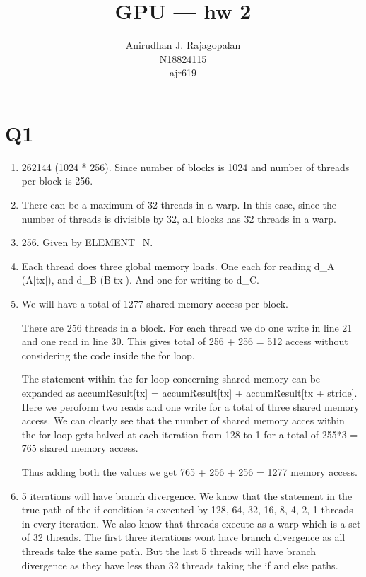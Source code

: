\documentclass{article}
\begin{document}
\title{GPU --- hw 2}
\author{Anirudhan J. Rajagopalan \\ N18824115 \\ ajr619 }
\maketitle

\newpage

\section*{Q1}
\begin{enumerate}
  \item 262144 (1024 * 256).  Since number of blocks is 1024 and number of threads per block is 256.
  \item There can be a maximum of 32 threads in a warp. In this case, since the number of threads is divisible by 32, all blocks has 32 threads in a warp.
  \item 256.  Given by ELEMENT\_N.
  \item Each thread does three global memory loads.  One each for reading d\_A (A[tx]), and d\_B (B[tx]).  And one for writing to d\_C.
  \item We will have a total of 1277 shared memory access per block.  
    
    There are 256 threads in a block.  For each thread we do one write in line 21 and one read in line 30.  This gives total of 256 + 256 = 512 access without considering the code inside the for loop.

    The statement within the for loop concerning shared memory can be expanded as accumResult[tx] = accumResult[tx] + accumResult[tx + stride].  Here we peroform two reads and one write for a total of three shared memory access.  We can clearly see that the number of shared memory acces within the for loop gets halved at each iteration from 128 to 1 for a total of 255*3 = 765 shared memory access.

    Thus adding both the values we get 765 + 256 + 256 = 1277 memory access.

  \item 5 iterations will have branch divergence.  
    We know that the statement in the true path of the if condition is executed by 128, 64, 32, 16, 8, 4, 2, 1 threads in every iteration.  
    We also know that threads execute as a warp which is a set of 32 threads.  
    The first three iterations wont have branch divergence as all threads take the same path.  
    But the last 5 threads will have branch divergence as they have less than 32 threads taking the if and else paths.


\end{enumerate}
\end{document}
